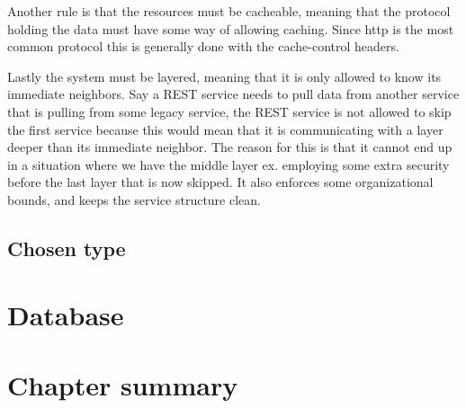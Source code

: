 Another rule is that the resources must be cacheable, meaning that the protocol holding the data must have some way of allowing caching. Since http is the most common protocol this is generally done with the cache-control headers\cite{rest:elkstein:architeture}.

Lastly the system must be layered\cite{rest:uci}, meaning that it is only allowed to know its immediate neighbors. Say a REST service needs to pull data from another service that is pulling from some legacy service, the REST service is not allowed to skip the first service because this would mean that it is communicating with a layer deeper than its immediate neighbor. The reason for this is that it cannot end up in a situation where we have the middle layer ex. employing some extra security before the last layer that is now skipped. It also enforces some organizational bounds, and keeps the service structure clean.

\subsection{Chosen type}
\label{sub:Chosen type}


\section{Database}
\label{sec:Database}


\section{Chapter summary}
